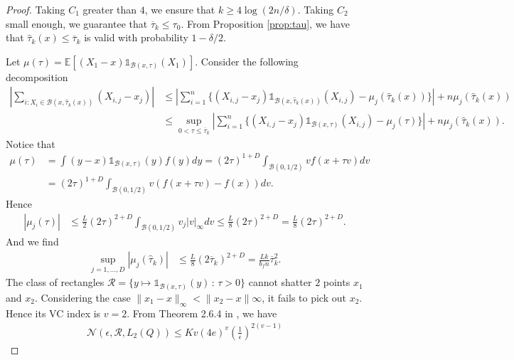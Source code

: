 \begin{proof}
Taking $C_1$ greater than $4$, we ensure that $k\geq 4   \log(2n/\delta)  $. Taking $C_2$ small enough, we guarantee that $ \overline \tau_k \leq \tau_ 0 $.
From Proposition \ref{prop:tau}, we have that $\hat \tau_ k(x) \leq \overline \tau _k $ is valid with probability $1-\delta/2$.

Let $ \mu(  \tau  ) =  \mathbb E [  (X_{1} - x )  \mathds{1}_{\mathcal B (x,     \tau ) }(X_1)] $.  Consider the following decomposition
\begin{align*}
  |  \sum_{i : X_i \in \mathcal B (x,  \hat \tau_k(x) ) } (X_{i,j}-x_j)  |& \leq \left|    \sum_{i = 1 }^n  \{ (X_{i,j}-x_j)\mathds{1}_{\mathcal B (x,     \hat \tau_k  (x) ) }(X_{i,j})  -  \mu_ j (  \hat \tau_k (x) )\}\right| +   n \mu _ j ( \hat \tau_ k(x) )   \\
  &\leq  \sup_{ 0 < \tau\leq \overline \tau_k } \left|    \sum_{i = 1 }^n  \{ (X_{i,j}-x_j)\mathds{1}_{\mathcal B (x,    \tau   ) }(X_{i,j})  -  \mu_ j (   \tau )\}\right| +  n \mu _ j ( \hat \tau_ k(x) ) .
\end{align*}
Notice that
\begin{align*}
\mu(  \tau  ) & = \int    ( y -x)   \mathds{1}_{\mathcal B (x,       \tau  ) }(y) f(y)d y=   (2  \tau  ) ^{1+D}  \int_{\mathcal B (0,1/2) } v f(x+\tau v)   dv\\
&=   (2  \tau  ) ^{1+D}  \int_{\mathcal B (0,1/2) } v (f(x+\tau v) - f(x))   dv.
\end{align*}
Hence
\begin{align*}
|\mu _ j (  \tau  ) |&\leq \frac L 2    (2  \tau  ) ^{2+D}  \int_{\mathcal B (0,1/2) } v_j    |v|_\infty   dv \leq \frac L 8   (2  \tau  ) ^{2+D} = \frac L 8     (2  \tau  ) ^{2+D}   .
\end{align*}
And we find
\begin{align*}
\sup_{j=1,\ldots, D} |\mu_j (  \hat \tau_ k)  |  &\leq  \frac L 8     (2  \overline\tau_k  ) ^{2+D}  =   \frac {L k}{ b_f n }        \overline\tau_k   ^{2}.
\end{align*}
The class of rectangles $\mathcal R = \{y\mapsto \mathds{1}_{\mathcal B (x ,     \tau    )}(y) \,:\, \tau >0 \}$ cannot shatter $2$ points $x_1$ and $x_2$. Considering the case $\|x_1- x\|_\infty < \| x_2-x \|\infty $, it fails to pick out $x_2$. Hence its VC index is $v = 2$. %
From Theorem 2.6.4 in \cite{vandervaartWeakConvergenceEmpirical1996a}, we have
\begin{align*}
\mathcal N  \left( \epsilon , \mathcal R , L_2 (Q)  \right)\leq Kv (4e) ^v \left( \frac 1 \epsilon \right)  ^{2 (v- 1) }  

\end{align*}
\end{proof}
